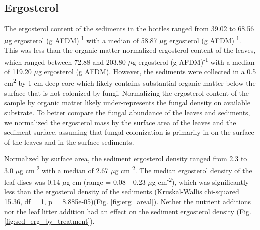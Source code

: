 \subsection{Ergosterol}

The ergosterol content of the sediments in the bottles ranged from 39.02 to 68.56 $\mu$g ergosterol (g AFDM)\textsuperscript{-1} with a median of 58.87 $\mu$g ergosterol (g AFDM)\textsuperscript{-1}. This was less than the organic matter normalized ergosterol content of the leaves, which ranged between 72.88 and 203.80 $\mu$g ergosterol (g AFDM)\textsuperscript{-1} with a median of 119.20 $\mu$g ergosterol (g AFDM). However, the sediments were collected in a 0.5 cm\textsuperscript{2} by 1 cm deep core which likely contains substantial organic matter below the surface that is not colonized by fungi. Normalizing the ergosterol content of the sample by organic matter likely under-represents the fungal density on available substrate.  To better compare the fungal abundance of the leaves and sediments, we normalized the ergosterol mass by the surface area of the leaves and the sediment surface, assuming that fungal colonization is primarily in on the surface of the leaves and in the surface sediments.

Normalized by surface area, the sediment ergosterol density ranged from 2.3 to 3.0 $\mu$g cm\textsuperscript{-2} with a median of 2.67 $\mu$g cm\textsuperscript{-2}. The median ergosterol density of the leaf discs was 0.14 $\mu$g cm (range = 0.08 - 0.23 $\mu$g cm\textsuperscript{-2}), which was significantly less than the ergosterol density of the sediments (Kruskal-Wallis chi-squared = 15.36, df = 1, p = 8.885e-05)(Fig. \ref{fig:erg_areal}). Nether the nutrient additions nor the leaf litter addition had an effect on the sediment ergosterol density (Fig. \ref{fig:sed_erg_by_treatment}).
